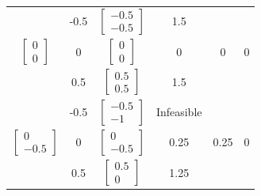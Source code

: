 \documentclass[14pt, a4paper]{extarticle}
\begin{document}
\begin{latin}
\begin{longtable}{|c|c|c|c|c|c|}
			&          -0.5              &$\begin{bmatrix} -0.5 \\ -0.5 \end{bmatrix}$      &        1.5             &      &        \\  \cline{2-4} 
			\multirow{-3}{*}{$\begin{bmatrix} 0 \\ 0 \end{bmatrix}$}&       0                 &$\begin{bmatrix} 0 \\ 0 \end{bmatrix}$      &     0                   &        0        &0  \\  \cline{2-4} 
			&           0.5             &$\begin{bmatrix} 0.5 \\ 0.5 \end{bmatrix}$      &             1.5            &           &  \\  \cline{2-4} \hline
			
			& -0.5 &$\begin{bmatrix} -0.5 \\ -1 \end{bmatrix}$      & Infeasible                        &             &      \\ \cline{2-4}
			\multirow{-3}{*}{$\begin{bmatrix} 0 \\ -0.5 \end{bmatrix}$}& 0    &$\begin{bmatrix} 0 \\ -0.5 \end{bmatrix}$      &     0.25                   &    0.25        &  0     \\ \cline{2-4}
			& 0.5  &$\begin{bmatrix} 0.5 \\ 0 \end{bmatrix}$      &    1.25                     &          &       \\ \hline
			

\end{longtable}
\end{latin}
\end{document}
